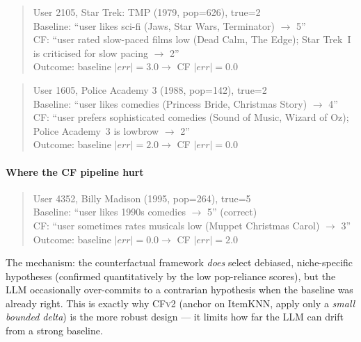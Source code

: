\documentclass[11pt,a4paper]{article}
\begin{document}
\begin{quote}
\small\ttfamily
User 2105, Star Trek: TMP (1979, pop=626), true=2\\
Baseline: ``user likes sci-fi (Jaws, Star Wars, Terminator) $\to$ 5''\\
CF: ``user rated slow-paced films low (Dead Calm, The Edge); Star Trek~I\\
     is criticised for slow pacing $\to$ 2''\\
Outcome: baseline $|err|{=}3.0 \to$ CF $|err|{=}0.0$\quad\checkmark
\end{quote}

\begin{quote}
\small\ttfamily
User 1605, Police Academy 3 (1988, pop=142), true=2\\
Baseline: ``user likes comedies (Princess Bride, Christmas Story) $\to$ 4''\\
CF: ``user prefers sophisticated comedies (Sound of Music, Wizard of Oz);\\
     Police Academy~3 is lowbrow $\to$ 2''\\
Outcome: baseline $|err|{=}2.0 \to$ CF $|err|{=}0.0$\quad\checkmark
\end{quote}

\paragraph{Where the CF pipeline hurt}
\begin{quote}
\small\ttfamily
User 4352, Billy Madison (1995, pop=264), true=5\\
Baseline: ``user likes 1990s comedies $\to$ 5''            (correct)\\
CF: ``user sometimes rates musicals low (Muppet Christmas Carol) $\to$ 3''\\
Outcome: baseline $|err|{=}0.0 \to$ CF $|err|{=}2.0$\quad\texttimes
\end{quote}

The mechanism: the counterfactual framework \emph{does} select debiased,
niche-specific hypotheses (confirmed quantitatively by the low
pop-reliance scores), but the LLM occasionally over-commits to a
contrarian hypothesis when the baseline was already right. This is exactly
why \textsc{CFv2} (anchor on ItemKNN, apply only a \emph{small bounded
delta}) is the more robust design --- it limits how far the LLM can drift
from a strong baseline.

\end{document}
